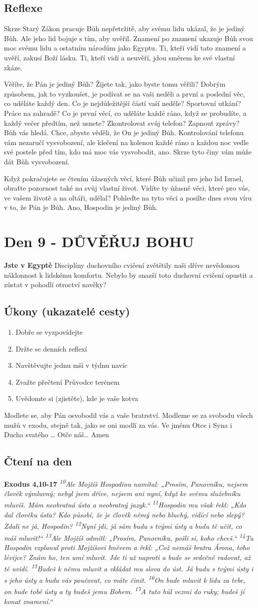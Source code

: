 \documentclass[11pt]{article}
\newcommand{\zacatekDruhyTyden}{
  \textbf{Jste v Egyptě} \newline
  Disciplíny duchovního cvičení zvětštily naši dříve nevědomou náklonnost k lidskému komfortu.
  Nebylo by snazší toto duchovní cvičení opustit a zůstat v pohodlí otroctví navěky?

  \subsection*{Úkony (ukazatelé cesty)}
\begin{enumerate}
  \item Dobře se vyzpovídejte
  \item Držte se denních reflexí
  \item Navštěvujte jednu mši v týdnu navíc
  \item Zvažte přečtení Průvodce terénem
  \item Uvědomte si (zjistěte), kde je vaše kotva
\end{enumerate}
Modlete se, aby Pán osvobodil vás a vaše bratrství. \newline
Modleme se za svobodu všech mužů v exodu, stejně tak, jako se oni modlí za vás.\newline
Ve jménu Otce i Syna i Ducha svatého …  Otče náš… Amen
}
\begin{document}
\subsection*{Reflexe}
Skrze Starý Zákon pracuje Bůh nepřetržitě, aby svému lidu ukázal, že je jediný Bůh. Ale jeho lid bojuje
s tím, aby uvěřil. Znamení po znamení ukazuje Bůh svou moc svému lidu a ostatním národům jako Egyptu.
Ti, kteří vidí tato znamení a uvěří, zakusí Boží lásku. Ti, kteří vidí a neuvěří, jdou směrem ke své vlastní
zkáze.

Věříte, že Pán je jediný Bůh? Žijete tak, jako byste tomu věřili? Dobrým způsobem, jak to vyzkoušet, je
podívat se na vaši neděli a první a poslední věc, co uděláte každý den. Co je nejdůležitější částí vaší neděle?
Sportovní utkání? Práce na zahradě? Co je první věcí, co uděláte každé ráno, když se probudíte, a každý
večer předtím, než usnete? Zkontrolovat svůj telefon? Zapnout zprávy? Bůh vás hledá. Chce, abyste věděli,
že On je jediný Bůh. Kontrolování telefonu vám nezaručí vysvobození, ale klečení na kolenou každé ráno
a každou noc vedle své postele před tím, kdo má moc vás vysvobodit, ano. Skrze tyto činy vám může dát
Bůh vysvobození.

Když pokračujete se čtením úžasných věcí, které Bůh učinil pro jeho lid Izrael, obraťte pozornost také na
svůj vlastní život. Vidíte ty úžasné věci, které pro vás, ve vašem životě a na oltáři, udělal? Pohleďte na tyto
věci a posilte dnes svou víru v to, že Pán je Bůh. Ano, Hospodin je jediný Bůh.


\newpage
\section{Den 9 - DŮVĚŘUJ BOHU}
\zacatekDruhyTyden
\subsection*{Čtení na den}
\textbf{Exodus 4,10-17}
\newline
\textit{
\textsuperscript{10}Ale Mojžíš Hospodinu namítal: „Prosím, Panovníku, nejsem člověk výmluvný; nebyl jsem dříve, nejsem ani nyní, když ke svému služebníku mluvíš. Mám neobratná ústa a neobratný jazyk.“
\textsuperscript{11}Hospodin mu však řekl: „Kdo dal člověku ústa? Kdo působí, že je člověk němý nebo hluchý, vidící nebo slepý? Zdali ne já, Hospodin?
\textsuperscript{12}Nyní jdi, já sám budu s tvými ústy a budu tě učit, co máš mluvit!“
\textsuperscript{13}Ale Mojžíš odmítl: „Prosím, Panovníku, pošli si, koho chceš.“
\textsuperscript{14}Tu Hospodin vzplanul proti Mojžíšovi hněvem a řekl: „Což nemáš bratra Árona, toho lévijce? Znám ho, ten umí mluvit. Jde ti už naproti a bude se srdečně radovat, až tě uvidí.
\textsuperscript{15}Budeš k němu mluvit a vkládat mu slova do úst. Já budu s tvými ústy i s jeho ústy a budu vás poučovat, co máte činit.
\textsuperscript{16}On bude mluvit k lidu za tebe, on bude tobě ústy a ty budeš jemu Bohem.
\textsuperscript{17}A tuto hůl vezmi do ruky; budeš jí konat znamení.“
}
\end{document}
